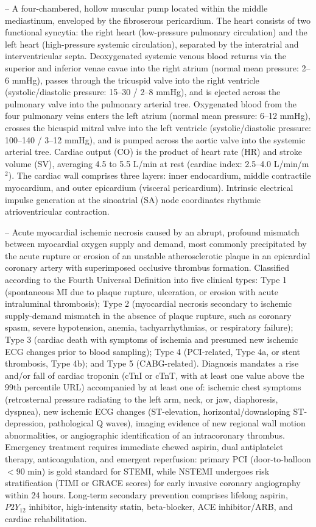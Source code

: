 -- A four-chambered, hollow muscular pump located within the middle mediastinum, enveloped by the fibroserous pericardium. The heart consists of two functional syncytia: the right heart (low-pressure pulmonary circulation) and the left heart (high-pressure systemic circulation), separated by the interatrial and interventricular septa. Deoxygenated systemic venous blood returns via the superior and inferior venae cavae into the right atrium (normal mean pressure: 2--6 mmHg), passes through the tricuspid valve into the right ventricle (systolic/diastolic pressure: 15--30 / 2--8 mmHg), and is ejected across the pulmonary valve into the pulmonary arterial tree. Oxygenated blood from the four pulmonary veins enters the left atrium (normal mean pressure: 6--12 mmHg), crosses the bicuspid mitral valve into the left ventricle (systolic/diastolic pressure: 100--140 / 3--12 mmHg), and is pumped across the aortic valve into the systemic arterial tree. Cardiac output (CO) is the product of heart rate (HR) and stroke volume (SV), averaging 4.5 to 5.5 L/min at rest (cardiac index: 2.5--4.0 L/min/m$^2$). The cardiac wall comprises three layers: inner endocardium, middle contractile myocardium, and outer epicardium (visceral pericardium). Intrinsic electrical impulse generation at the sinoatrial (SA) node coordinates rhythmic atrioventricular contraction.

-- Acute myocardial ischemic necrosis caused by an abrupt, profound mismatch between myocardial oxygen supply and demand, most commonly precipitated by the acute rupture or erosion of an unstable atherosclerotic plaque in an epicardial coronary artery with superimposed occlusive thrombus formation. Classified according to the Fourth Universal Definition into five clinical types: Type 1 (spontaneous MI due to plaque rupture, ulceration, or erosion with acute intraluminal thrombosis); Type 2 (myocardial necrosis secondary to ischemic supply-demand mismatch in the absence of plaque rupture, such as coronary spasm, severe hypotension, anemia, tachyarrhythmias, or respiratory failure); Type 3 (cardiac death with symptoms of ischemia and presumed new ischemic ECG changes prior to blood sampling); Type 4 (PCI-related, Type 4a, or stent thrombosis, Type 4b); and Type 5 (CABG-related). Diagnosis mandates a rise and/or fall of cardiac troponin (cTnI or cTnT, with at least one value above the 99th percentile URL) accompanied by at least one of: ischemic chest symptoms (retrosternal pressure radiating to the left arm, neck, or jaw, diaphoresis, dyspnea), new ischemic ECG changes (ST-elevation, horizontal/downsloping ST-depression, pathological Q waves), imaging evidence of new regional wall motion abnormalities, or angiographic identification of an intracoronary thrombus. Emergency treatment requires immediate chewed aspirin, dual antiplatelet therapy, anticoagulation, and emergent reperfusion: primary PCI (door-to-balloon $<90$ min) is gold standard for STEMI, while NSTEMI undergoes risk stratification (TIMI or GRACE scores) for early invasive coronary angiography within 24 hours. Long-term secondary prevention comprises lifelong aspirin, $P2Y_{12}$ inhibitor, high-intensity statin, beta-blocker, ACE inhibitor/ARB, and cardiac rehabilitation.

